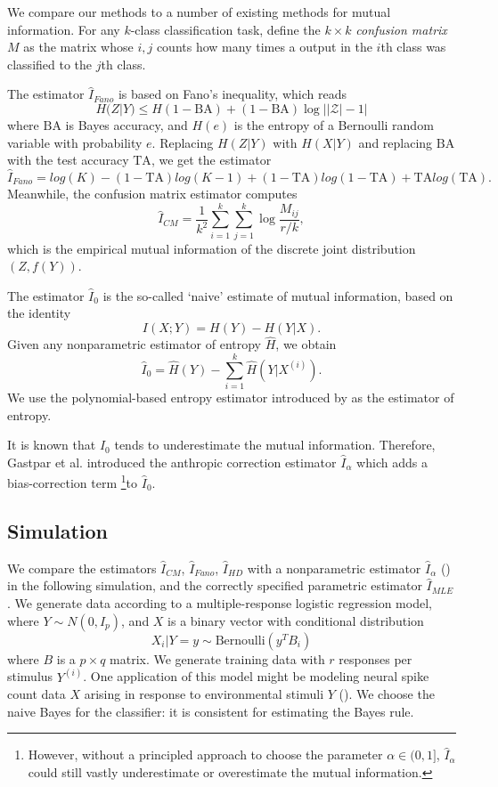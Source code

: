 We compare our methods to a number of existing methods for mutual
information.  For any $k$-class classification task, define the $k
\times k$ \emph{confusion matrix} $M$ as the matrix whose $i, j$
counts how many times a output in the $i$th class was classified to
the $j$th class.

The estimator $\hat{I}_{Fano}$ is based on Fano's inequality, which reads
\[
H(Z|Y) \leq H(1-\text{BA}) + (1-\text{BA}) \log ||\mathcal{Z}| - 1|
\]
where $\text{BA}$ is Bayes accuracy, and $H(e)$ is the entropy of a
Bernoulli random variable with probability $e$.  Replacing $H(Z|Y)$
with $H(X|Y)$ and replacing $\text{BA}$ with the test accuracy $\text{TA}$,
we get the estimator
\[
\hat{I}_{Fano} = log(K) - (1-\text{TA}) log(K-1) + (1-\text{TA}) log(1-\text{TA}) + \text{TA} log(\text{TA}).
\]
Meanwhile, the confusion matrix estimator computes
\[
\hat{I}_{CM} = \frac{1}{k^2} \sum_{i=1}^k \sum_{j=1}^k \log \frac{M_{ij}}{r/k},
\]
which is the empirical mutual information of the discrete joint
distribution $(Z, f(Y))$.

The estimator $\hat{I}_0$ is the so-called `naive' estimate of mutual information, based on the identity
\[
I(X;Y) = H(Y) - H(Y|X).
\]
Given any nonparametric estimator of entropy $\hat{H}$, we obtain
\[
\hat{I}_0 = \hat{H}(Y) - \sum_{i=1}^k \hat{H}(Y|X^{(i)}).
\]
We use the polynomial-based entropy estimator introduced by
\cite{jiao2015minimax} as the estimator of entropy.  

It is known that $\hat{I}_0$ tends to underestimate the mutual
information.  Therefore, Gastpar et al. introduced the anthropic
correction estimator $\hat{I}_\alpha$ which adds a bias-correction
term \footnote{However, without a principled approach to choose the
  parameter $\alpha \in (0,1]$, $\hat{I}_\alpha$ could still vastly
underestimate or overestimate the mutual information.}to $\hat{I}_0$.

\subsection{Simulation}

We compare the estimators $\hat{I}_{CM}$, $\hat{I}_{Fano}$,
$\hat{I}_{HD}$ with a nonparametric estimator $\hat{I}_\alpha$
(\cite{Gastpar2009}) in the following simulation, and the correctly
specified parametric estimator $\hat{I}_{MLE}$.  We generate data
according to a multiple-response logistic regression model, where $ Y
\sim N(0, I_p) $, and $X$ is a binary vector with conditional
distribution
\[
X_i|Y = y \sim \text{Bernoulli}(y^T B_i)
\]
where $B$ is a $p \times q$ matrix.  We generate training data with
$r$ responses per stimulus $Y^{(i)}$.  One application of this model
might be modeling neural spike count data $X$ arising in response to
environmental stimuli $Y$ (\cite{banerjee2012parametric}).  We choose
the naive Bayes for the classifier: it is consistent for
estimating the Bayes rule.

